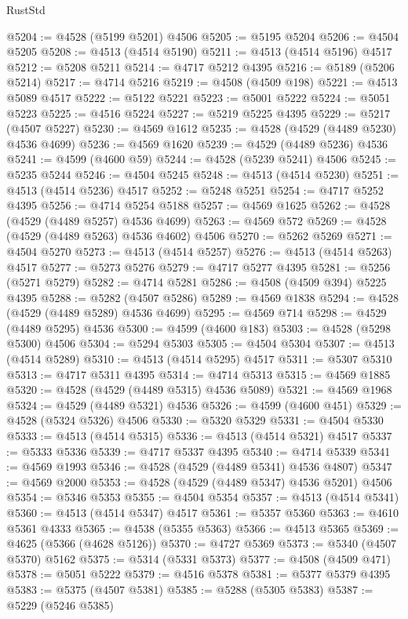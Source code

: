 \begin{lexlean}{RustStd}
\begin{coremodule}
@5204 := @4528 (@5199 @5201) @4506
@5205 := @5195 @5204
@5206 := @4504 @5205
@5208 := @4513 (@4514 @5190)
@5211 := @4513 (@4514 @5196) @4517
@5212 := @5208 @5211
@5214 := @4717 @5212 @4395
@5216 := @5189 (@5206 @5214)
@5217 := @4714 @5216
@5219 := @4508 (@4509 @198)
@5221 := @4513 @5089 @4517
@5222 := @5122 @5221
@5223 := @5001 @5222
@5224 := @5051 @5223
@5225 := @4516 @5224
@5227 := @5219 @5225 @4395
@5229 := @5217 (@4507 @5227)
@5230 := @4569 @1612
@5235 := @4528 (@4529 (@4489 @5230) @4536 @4699)
@5236 := @4569 @1620
@5239 := @4529 (@4489 @5236) @4536
@5241 := @4599 (@4600 @59)
@5244 := @4528 (@5239 @5241) @4506
@5245 := @5235 @5244
@5246 := @4504 @5245
@5248 := @4513 (@4514 @5230)
@5251 := @4513 (@4514 @5236) @4517
@5252 := @5248 @5251
@5254 := @4717 @5252 @4395
@5256 := @4714 @5254 @5188
@5257 := @4569 @1625
@5262 := @4528 (@4529 (@4489 @5257) @4536 @4699)
@5263 := @4569 @572
@5269 := @4528 (@4529 (@4489 @5263) @4536 @4602) @4506
@5270 := @5262 @5269
@5271 := @4504 @5270
@5273 := @4513 (@4514 @5257)
@5276 := @4513 (@4514 @5263) @4517
@5277 := @5273 @5276
@5279 := @4717 @5277 @4395
@5281 := @5256 (@5271 @5279)
@5282 := @4714 @5281
@5286 := @4508 (@4509 @394) @5225 @4395
@5288 := @5282 (@4507 @5286)
@5289 := @4569 @1838
@5294 := @4528 (@4529 (@4489 @5289) @4536 @4699)
@5295 := @4569 @714
@5298 := @4529 (@4489 @5295) @4536
@5300 := @4599 (@4600 @183)
@5303 := @4528 (@5298 @5300) @4506
@5304 := @5294 @5303
@5305 := @4504 @5304
@5307 := @4513 (@4514 @5289)
@5310 := @4513 (@4514 @5295) @4517
@5311 := @5307 @5310
@5313 := @4717 @5311 @4395
@5314 := @4714 @5313
@5315 := @4569 @1885
@5320 := @4528 (@4529 (@4489 @5315) @4536 @5089)
@5321 := @4569 @1968
@5324 := @4529 (@4489 @5321) @4536
@5326 := @4599 (@4600 @451)
@5329 := @4528 (@5324 @5326) @4506
@5330 := @5320 @5329
@5331 := @4504 @5330
@5333 := @4513 (@4514 @5315)
@5336 := @4513 (@4514 @5321) @4517
@5337 := @5333 @5336
@5339 := @4717 @5337 @4395
@5340 := @4714 @5339
@5341 := @4569 @1993
@5346 := @4528 (@4529 (@4489 @5341) @4536 @4807)
@5347 := @4569 @2000
@5353 := @4528 (@4529 (@4489 @5347) @4536 @5201) @4506
@5354 := @5346 @5353
@5355 := @4504 @5354
@5357 := @4513 (@4514 @5341)
@5360 := @4513 (@4514 @5347) @4517
@5361 := @5357 @5360
@5363 := @4610 @5361 @4333
@5365 := @4538 (@5355 @5363)
@5366 := @4513 @5365
@5369 := @4625 (@5366 (@4628 @5126))
@5370 := @4727 @5369
@5373 := @5340 (@4507 @5370) @5162
@5375 := @5314 (@5331 @5373)
@5377 := @4508 (@4509 @471)
@5378 := @5051 @5222
@5379 := @4516 @5378
@5381 := @5377 @5379 @4395
@5383 := @5375 (@4507 @5381)
@5385 := @5288 (@5305 @5383)
@5387 := @5229 (@5246 @5385)

\end{coremodule}
\end{lexlean}
